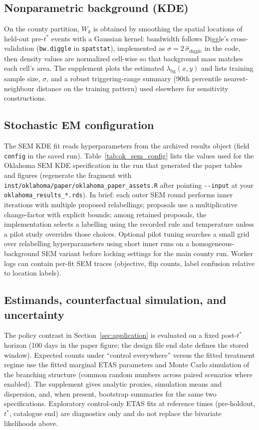 \documentclass{statsoc}
\newcommand{\1}{\mathbbm{1}}
\begin{document}
\subsection{Nonparametric background (KDE)}\label{sec:ok_kde}
On the county partition, $W_k$ is obtained by smoothing the spatial locations of held-out pre-$t^\ast$ events with a Gaussian kernel: bandwidth follows Diggle's cross-validation (\verb|bw.diggle| in \texttt{spatstat}), implemented as $\sigma = 2\,\hat\sigma_{\mathrm{diggle}}$ in the code, then density values are normalized cell-wise so that background mass matches each cell's area. The supplement plots the estimated $\lambda_{\mathrm{bg}}(x,y)$ and lists training sample size, $\sigma$, and a robust triggering-range summary (90th percentile nearest-neighbour distance on the training pattern) used elsewhere for sensitivity constructions.

\subsection{Stochastic EM configuration}\label{sec:ok_sem_config}
The SEM KDE fit reads hyperparameters from the archived results object (field \verb|config| in the saved run). Table~\ref{tab:ok_sem_config} lists the values used for the Oklahoma SEM KDE specification in the run that generated the paper tables and figures (regenerate the fragment with \verb|inst/oklahoma/paper/oklahoma_paper_assets.R| after pointing \verb|--input| at your \verb|oklahoma_results_*.rds|). In brief: each outer SEM round performs inner iterations with multiple proposed relabellings; proposals use a multiplicative change-factor with explicit bounds; among retained proposals, the implementation selects a labelling using the recorded rule and temperature unless a pilot study overrides those choices. Optional pilot tuning searches a small grid over relabelling hyperparameters using short inner runs on a homogeneous-background SEM variant before locking settings for the main county run. Worker logs can contain per-fit SEM traces (objective, flip counts, label confusion relative to location labels).



\subsection{Estimands, counterfactual simulation, and uncertainty}\label{sec:ok_estimands}
The policy contrast in Section~\ref{sec:application} is evaluated on a fixed post-$t^\ast$ horizon (100 days in the paper figure; the design file end date defines the stored window). Expected counts under ``control everywhere'' versus the fitted treatment regime use the fitted marginal ETAS parameters and Monte Carlo simulation of the branching structure (common random numbers across paired scenarios where enabled). The supplement gives analytic proxies, simulation means and dispersion, and, when present, bootstrap summaries for the same two specifications. Exploratory control-only ETAS fits at reference times (pre-holdout, $t^\ast$, catalogue end) are diagnostics only and do not replace the bivariate likelihoods above.
\end{document}
